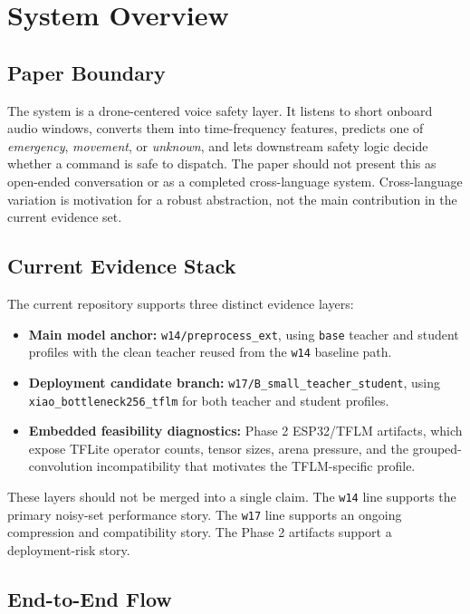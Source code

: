 \section{System Overview}
\label{sec:overview}

\subsection{Paper Boundary}

The system is a drone-centered voice safety layer. It listens to short onboard audio windows, converts them into time-frequency features, predicts one of \emph{emergency}, \emph{movement}, or \emph{unknown}, and lets downstream safety logic decide whether a command is safe to dispatch. The paper should not present this as open-ended conversation or as a completed cross-language system. Cross-language variation is motivation for a robust abstraction, not the main contribution in the current evidence set.

\subsection{Current Evidence Stack}

The current repository supports three distinct evidence layers:
\begin{itemize}
\item \textbf{Main model anchor:} \texttt{w14/preprocess\_ext}, using \texttt{base} teacher and student profiles with the clean teacher reused from the \texttt{w14} baseline path.
\item \textbf{Deployment candidate branch:} \texttt{w17/B\_small\_teacher\_student}, using \texttt{xiao\_bottleneck256\_tflm} for both teacher and student profiles.
\item \textbf{Embedded feasibility diagnostics:} Phase 2 ESP32/TFLM artifacts, which expose TFLite operator counts, tensor sizes, arena pressure, and the grouped-convolution incompatibility that motivates the TFLM-specific profile.
\end{itemize}

These layers should not be merged into a single claim. The \texttt{w14} line supports the primary noisy-set performance story. The \texttt{w17} line supports an ongoing compression and compatibility story. The Phase 2 artifacts support a deployment-risk story.

\subsection{End-to-End Flow}

